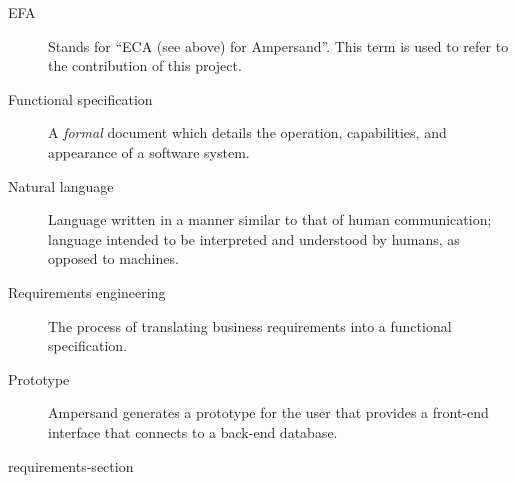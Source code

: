 \documentclass[journal,12pt,onecolumn,draftclsnofoot]{article}
\begin{document}
\begin{description}
    \item [EFA] Stands for ``ECA (see above) for Ampersand''. This term is used 
    to 
    refer to the contribution of this project. 
    
    \item [Functional specification] A \emph{formal} document which details the 
    operation,
    capabilities, and appearance of a software system. 
    
    \item [Natural language] Language written in a manner similar to that of 
    human 
    communication; language intended to be interpreted and understood by 
    humans, as 
    opposed to machines. 
    
    \item [Requirements engineering] The process of translating business
    requirements into a functional specification. 
    
    \item [Prototype] Ampersand generates a prototype for the user that 
    provides a 
    front-end interface that connects to a back-end database.
    
\end{description}

 {requirements-section}






\newpage



\newpage

\end{document}
